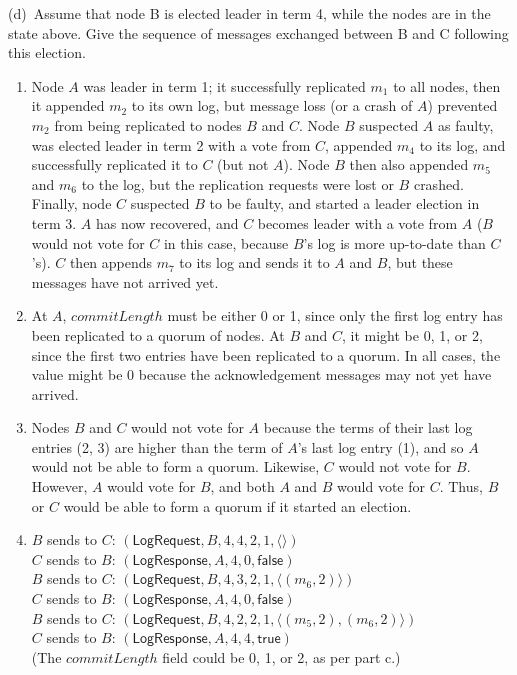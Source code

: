 {    \noindent (d)~Assume that node B is elected leader in term 4, while the nodes are in the state above.
    Give the sequence of messages exchanged between B and C following this election.
}{
    \begin{enumerate} \renewcommand{\theenumi}{\alph{enumi}} %
        \item Node $A$ was leader in term 1; it successfully replicated $m_1$ to all nodes, then it appended $m_2$ to its own log, but message loss (or a crash of $A$) prevented $m_2$ from being replicated to nodes $B$ and $C$.
            Node $B$ suspected $A$ as faulty, was elected leader in term 2 with a vote from $C$, appended $m_4$ to its log, and successfully replicated it to $C$ (but not $A$).
            Node $B$ then also appended $m_5$ and $m_6$ to the log, but the replication requests were lost or $B$ crashed.
            Finally, node $C$ suspected $B$ to be faulty, and started a leader election in term 3.
            $A$ has now recovered, and $C$ becomes leader with a vote from $A$ ($B$ would not vote for $C$ in this case, because $B$'s log is more up-to-date than $C$'s).
            $C$ then appends $m_7$ to its log and sends it to $A$ and $B$, but these messages have not arrived yet.
        \item At $A$, $\mathit{commitLength}$ must be either 0 or 1, since only the first log entry has been replicated to a quorum of nodes.
            At $B$ and $C$, it might be 0, 1, or 2, since the first two entries have been replicated to a quorum.
            In all cases, the value might be 0 because the acknowledgement messages may not yet have arrived.
        \item Nodes $B$ and $C$ would not vote for $A$ because the terms of their last log entries (2, 3) are higher than the term of $A$'s last log entry (1), and so $A$ would not be able to form a quorum.
            Likewise, $C$ would not vote for $B$.
            However, $A$ would vote for $B$, and both $A$ and $B$ would vote for $C$.
            Thus, $B$ or $C$ would be able to form a quorum if it started an election.
        \item $B$ sends to $C$: $(\mathsf{LogRequest}, B, 4, 4, 2, 1, \langle\rangle)$ \\
            $C$ sends to $B$: $(\mathsf{LogResponse}, A, 4, 0, \mathsf{false})$ \\
            $B$ sends to $C$: $(\mathsf{LogRequest}, B, 4, 3, 2, 1, \langle(m_6, 2)\rangle)$ \\
            $C$ sends to $B$: $(\mathsf{LogResponse}, A, 4, 0, \mathsf{false})$ \\
            $B$ sends to $C$: $(\mathsf{LogRequest}, B, 4, 2, 2, 1, \langle(m_5, 2), (m_6, 2)\rangle)$ \\
            $C$ sends to $B$: $(\mathsf{LogResponse}, A, 4, 4, \mathsf{true})$ \\
            (The $\mathit{commitLength}$ field could be 0, 1, or 2, as per part c.)
    \end{enumerate}
}

